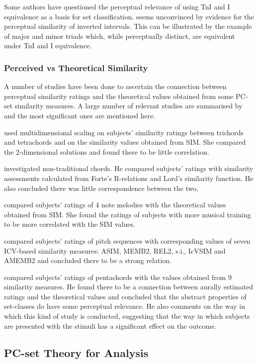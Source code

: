 \documentclass{article}
\begin{document}
Some authors have questioned the perceptual relevance of using TnI and
I equivalence as a basis for set classification. \citet{Deutsch1982}
seems unconvinced by evidence for the perceptual similarity of
inverted intervals. This can be illustrated by the example of major
and minor triads which, while perceptually distinct, are equivalent
under TnI and I equivalence.
\subsubsection{Perceived vs Theoretical Similarity}
\label{sec-3-5-3}

A number of studies have been done to ascertain the connection between
perceptual similarity ratings and the theoretical values obtained from
some PC-set similarity measures. A large number of relevant studies
are summarised by \citet{Kuusi2001} and the most significant ones are
mentioned here.

\citet{Bruner1984} used multidimensional scaling on subjects'
similarity ratings between trichords and tetrachords and on the
similarity values obtained from SIM. She compared the
2-dimensional solutions and found there to be little correlation.

\citet{Gibson1986} investigated non-traditional chords. He compared
subjects' ratings with similarity assessments calculated from Forte's
R-relations and Lord's similarity function. He also concluded there
was little correspondence between the two.

\citet{Stammers1994} compared subjects' ratings of 4 note melodies with
the theoretical values obtained from SIM. She found the ratings of
subjects with more musical training to be more correlated with the SIM
values.

\citet{Lane1997} compared subjects' ratings of pitch sequences with
corresponding values of seven ICV-based similarity measures: ASIM,
MEMB2, REL2, s.i., IcVSIM and AMEMB2 and concluded there to be a
strong relation.

\citet{Kuusi2001} compared subjects' ratings of pentachords with the
values obtained from 9 similarity measures. He found there to be a
connection between aurally estimated ratings and the theoretical
values and concluded that the abstract properties of set-classes do
have some perceptual relevance. He also comments on the way in which
this kind of study is conducted, suggesting that the way in which
subjects are presented with the stimuli has a significant effect on
the outcome.
\subsection{PC-set Theory for Analysis}
\label{sec-3-6}
\end{document}

